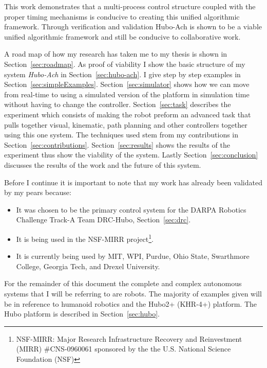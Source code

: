 This work demonstrates that a multi-process control structure coupled with the proper timing mechanisms is conducive to creating this unified algorithmic framework.
Through verification and validation Hubo-Ach is shown to be a viable unified algorithmic framework and still be conducive to collaborative work.  

A road map of how my research has taken me to my thesis is shown in Section~\ref{sec:roadmap}.
As proof of viability I show the basic structure of my system \textit{Hubo-Ach} in Section~\ref{sec:hubo-ach}.  
I give step by step examples in Section~\ref{sec:simpleExamples}.
Section~\ref{sec:simulator} shows how we can move from real-time to using a simulated version of the platform in simulation time without having to change the controller.
Section~\ref{sec:task} describes the experiment which consists of making the robot preform an advanced task that pulls together visual, kinematic, path planning and other controllers together using this one system.
The techniques used stem from my contributions in Section~\ref{sec:contributions}.
Section~\ref{sec:results} shows the results of the experiment thus show the viability of the system.
Lastly Section~\ref{sec:conclusion} discusses the results of the work and the future of this system.

Before I continue it is important to note that my work has already been validated by my pears because:
\begin{itemize}
\item It was chosen to be the primary control system for the DARPA Robotics Challenge Track-A Team DRC-Hubo, Section~\ref{sec:drc}.
\item It is being used in the NSF-MIRR project\footnote{NSF-MIRR: Major Research Infrastructure Recovery and Reinvestment (MIRR) \#CNS-0960061 sponsored by the the U.S. National Science Foundation (NSF)}.
\item It is currently being used by MIT, WPI, Purdue, Ohio State, Swarthmore College, Georgia Tech, and Drexel University.
\end{itemize}

For the remainder of this document the complete and complex autonomous systems that I will be referring to are robots.
The majority of examples given will be in reference to humanoid robotics and the Hubo2+ (KHR-4+) platform.
The Hubo platform is described in Section~\ref{sec:hubo}.







































